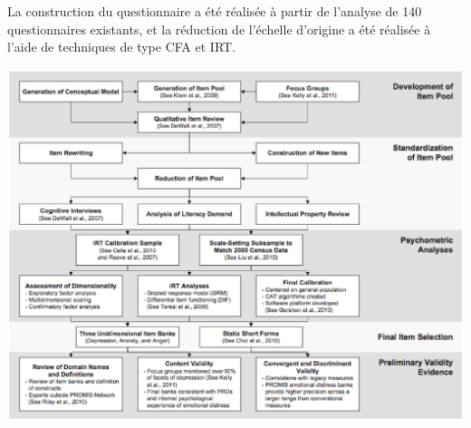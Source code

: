 La construction du questionnaire a été réalisée à partir de l'analyse de 140
questionnaires existants, et la réduction de l'échelle d'origine a été réalisée
à l'aide de techniques de type CFA et IRT.


{\centering \includegraphics[width=.65\textwidth]{figs/promis.eps}\par}


